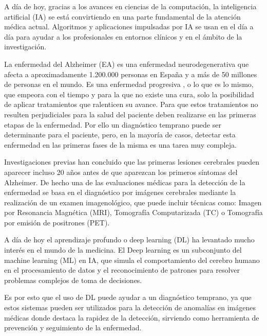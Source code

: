 

A día de hoy, gracias a los avances en ciencias de la computación, la inteligencia artificial (IA) se está convirtiendo
en una parte fundamental de la atención médica actual.
Algoritmos y aplicaciones impulsadas por IA se usan en el día a día para ayudar a los profesionales en entornos clínicos
y en el ámbito de la investigación.

La enfermedad del Alzheimer (EA)  es una enfermedad neurodegenerativa que afecta a aproximadamente 1.200.000 personas
en España y a más de 50 millones de personas en el mundo.
 Es una enfermedad progresiva , o lo que es lo mismo, que empeora con el tiempo y para la que no existe una cura, solo
la posibilidad de aplicar tratamientos que ralenticen su avance.
Para que estos tratamientos no resulten perjudiciales para la salud del paciente deben realizarse en las primeras etapas
de la enfermedad.
Por ello un diagnóstico temprano puede ser determinante para el paciente, pero, en la mayoría de casos, detectar esta
enfermedad en las primeras fases de la misma es una tarea muy compleja.

Investigaciones previas han concluido que las primeras lesiones cerebrales pueden aparecer incluso 20 años antes de que
aparezcan los primeros síntomas del Alzheimer.
De hecho una de las evaluaciones médicas para la detección de la enfermedad se basa en el diagnóstico por imágenes
cerebrales mediante la realización de un examen imagenológico, que puede incluir técnicas como: Imagen por Resonancia
Magnética (MRI), Tomografía Computarizada (TC) o Tomografía por emisión de positrones (PET).

A día de hoy el aprendizaje profundo o deep learning (DL)  ha levantado mucho interés en el mundo de la medicina.
El Deep learning es un subconjunto del machine learning (ML) en IA, que simula el comportamiento del cerebro humano en
el procesamiento de datos y el reconocimiento de patrones para resolver problemas complejos de toma de decisiones.

Es por esto que el uso de DL puede ayudar a un diagnóstico temprano, ya que estos sistemas pueden ser utilizados para la
detección de anomalías en imágenes médicas donde destaca la rapidez de la detección, sirviendo como herramienta de
prevención y seguimiento de la enfermedad.

